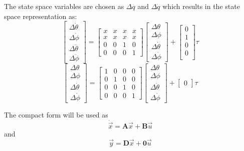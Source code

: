\documentclass[a4paper,12pt]{article}
\begin{document}
\begin{appendices}
		The state space variables are chosen as $\Delta{q}$ and $\Delta{\dot{q}}$ which results in the state space representation as:
		\[		
		\begin{bmatrix}
			\Delta{\dot{\theta}} \\
			\Delta{\dot{\phi}}	\\
			\Delta{\ddot{\theta}} \\
			\Delta{\ddot{\phi}}
		\end{bmatrix} 
		=
		\begin{bmatrix}
		x & x & x & x \\
		x & x & x & x \\
		0 & 0 & 1 & 0 \\
		0 & 0 & 0 & 1
		\end{bmatrix}
		\begin{bmatrix}
		\Delta{\theta}	\\
		\Delta{\phi}	\\
		\Delta{\dot{\theta}} \\
		\Delta{\dot{\phi}}
		\end{bmatrix}
		+
		\begin{bmatrix}
		0 \\
		1 \\
		0 \\
		0 \\
		\end{bmatrix}
		\tau
		\]
		\[
		\begin{bmatrix}
		\Delta{\theta}	\\
		\Delta{\phi}	\\
		\Delta{\dot{\theta}} \\
		\Delta{\dot{\phi}}
		\end{bmatrix}
		=
		\begin{bmatrix}
		1 & 0 & 0 & 0 \\
		0 & 1 & 0 & 0 \\
		0 & 0 & 1 & 0 \\
		0 & 0 & 0 & 1
		\end{bmatrix}
		\begin{bmatrix}
		\Delta{\theta}	\\
		\Delta{\phi}	\\
		\Delta{\dot{\theta}} \\
		\Delta{\dot{\phi}}
		\end{bmatrix}
		+
		\begin{bmatrix}
		0 
		\end{bmatrix}
		\tau
		\]
		
		The compact form will be used as $$ \dot{\vec{x}} = \boldsymbol{A}\vec{x} + \boldsymbol{B}\vec{u} $$ and $$ \vec{y} = \boldsymbol{D}\vec{x} + \boldsymbol{0}\vec{u} $$
		\newpage

\end{appendices}
\end{document}
